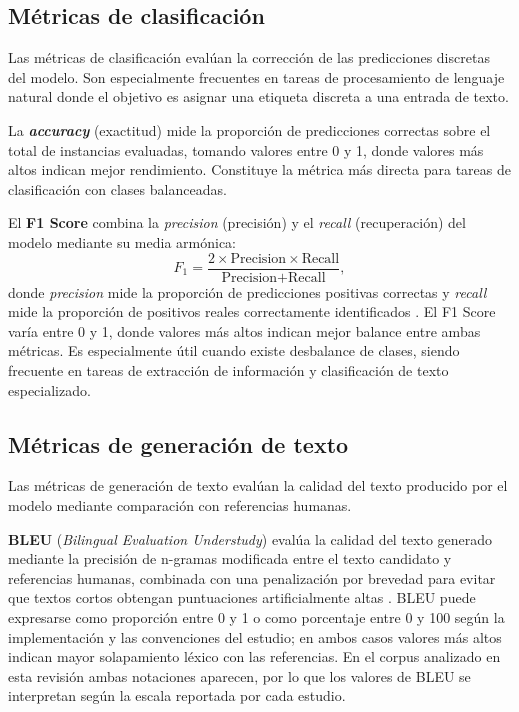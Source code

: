 \subsection{Métricas de clasificación}

Las métricas de clasificación evalúan la corrección de las predicciones discretas del modelo. Son especialmente frecuentes en tareas de procesamiento de lenguaje natural donde el objetivo es asignar una etiqueta discreta a una entrada de texto.

La \textbf{\textit{accuracy}} (exactitud) mide la proporción de predicciones correctas sobre el total de instancias evaluadas, tomando valores entre 0 y 1, donde valores más altos indican mejor rendimiento. Constituye la métrica más directa para tareas de clasificación con clases balanceadas.

El \textbf{F1 Score} combina la \textit{precision} (precisión) y el \textit{recall} (recuperación) del modelo mediante su media armónica:
\begin{equation}
F_1 = \frac{2 \times \text{Precision} \times \text{Recall}}{\text{Precision} + \text{Recall}},
\end{equation}
donde \textit{precision} mide la proporción de predicciones positivas correctas y \textit{recall} mide la proporción de positivos reales correctamente identificados \parencite[p.~27]{Chang2024}. El F1 Score varía entre 0 y 1, donde valores más altos indican mejor balance entre ambas métricas. Es especialmente útil cuando existe desbalance de clases, siendo frecuente en tareas de extracción de información y clasificación de texto especializado.

\subsection{Métricas de generación de texto}

Las métricas de generación de texto evalúan la calidad del texto producido por el modelo mediante comparación con referencias humanas.

\textbf{BLEU} (\textit{Bilingual Evaluation Understudy}) evalúa la calidad del texto generado mediante la precisión de n-gramas modificada entre el texto candidato y referencias humanas, combinada con una penalización por brevedad para evitar que textos cortos obtengan puntuaciones artificialmente altas \parencite[p.~5]{papineni-etal-2002-bleu}. BLEU puede expresarse como proporción entre 0 y 1 o como porcentaje entre 0 y 100 según la implementación y las convenciones del estudio; en ambos casos valores más altos indican mayor solapamiento léxico con las referencias. En el corpus analizado en esta revisión ambas notaciones aparecen, por lo que los valores de BLEU se interpretan según la escala reportada por cada estudio.

